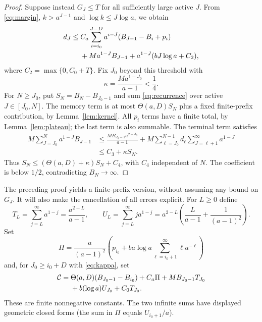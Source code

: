 \documentclass[11pt]{amsart}
\theoremstyle{remark}\newtheorem{remark}[theorem]{Remark}
\begin{document}
\begin{proof}
Suppose instead $G_J\le T$ for all sufficiently large active $J$.
From \eqref{eq:margin}, $k>a^{J-1}$ and $\log k\le J\log a$, we obtain
\begin{align}
 d_J\le{}&C_a\sum_{i=i_0}^{J-D}a^{i-J}(B_{J-1}-B_i+p_i)\notag\\
 &+Ma^{1-J}B_{J-1}
    +a^{1-J}(bJ\log a+C_2),\label{eq:recurrence}
\end{align}
where $C_2=\max\{0,C_0+T\}$. Fix $J_0$ beyond this threshold with
\begin{equation}\label{eq:kappa}
 \kappa=\frac{Ma^{1-J_0}}{a-1}<\frac14.
\end{equation}
For $N\ge J_0$, put $S_N=B_N-B_{J_0-1}$ and sum
\eqref{eq:recurrence} over active $J\in[J_0,N]$. The memory term is at
most $\Theta(a,D)S_N$ plus a fixed finite-prefix contribution, by
Lemma~\ref{lem:kernel}. All $p_i$ terms have a finite total, by
Lemma~\ref{lem:plateau}; the last term is also summable.
The terminal term satisfies
\begin{align*}
 M\sum_{J=J_0}^N a^{1-J}B_{J-1}
 &\le\frac{MB_{J_0-1}a^{2-J_0}}{a-1}
    +M\sum_{\ell=J_0}^{N-1}d_\ell
                    \sum_{J=\ell+1}^{\infty}a^{1-J}\\
 &\le C_3+\kappa S_N.
\end{align*}
Thus $S_N\le(\Theta(a,D)+\kappa)S_N+C_4$, with $C_4$ independent of $N$.
The coefficient is below $1/2$, contradicting $B_N\to\infty$.
\end{proof}

The preceding proof yields a finite-prefix version, without assuming any
bound on $G_J$. It will also make the cancellation of all errors explicit.
For $L\ge0$ define
\[
 T_L=\sum_{j=L}^{\infty}a^{1-j}=\frac{a^{2-L}}{a-1},\qquad
 U_L=\sum_{j=L}^{\infty}j a^{1-j}
 =a^{2-L}\left(\frac{L}{a-1}+\frac1{(a-1)^2}\right).
\]
Set
\[
 \Pi=\frac{a}{(a-1)^2}
   \left(p_{i_0}+ba\log a\sum_{\ell=i_0+1}^{\infty}\ell a^{-\ell}\right)
\]
and, for $J_0\ge i_0+D$ with \eqref{eq:kappa}, set
\begin{align}
 \mathcal C={}&\Theta(a,D)(B_{J_0-1}-B_{i_0})+C_a\Pi
       +MB_{J_0-1}T_{J_0}\notag\\
       &+b(\log a)U_{J_0}+C_0T_{J_0}.\label{eq:explicitC}
\end{align}
These are finite nonnegative constants. The two infinite sums have displayed
geometric closed forms (the sum in $\Pi$ equals $U_{i_0+1}/a$).
\end{document}
